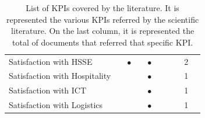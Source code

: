 \begin{table}
\begin{adjustwidth}{2cm}{0cm}
{\begin{tabular}{p{6cm}llllllp{1cm}lr}
		Satisfaction with HSSE			& &$\bullet$ & &$\bullet$ & & & & 2 \\
		Satisfaction with Hospitality	& & & &$\bullet$ & & & & 1 \\
		Satisfaction with ICT 			& & & &$\bullet$ & & & & 1 \\
		Satisfaction with Logistics 	& & & &$\bullet$ & & & & 1 \\
	\end{tabular}
	}
	\end{adjustwidth}
\caption{List of KPIs covered by the literature. It is represented the various KPIs referred by the scientific literature. On the last column, it is represented the total of documents that referred that specific KPI.}
\label{tb:ListSpacialFinancialKPIpapers}
\end{table}

